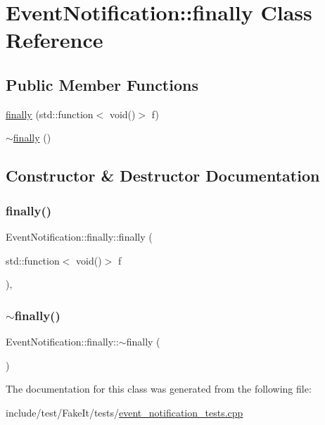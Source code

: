 \hypertarget{classEventNotification_1_1finally}{}\section{Event\+Notification\+::finally Class Reference}
\label{classEventNotification_1_1finally}
\subsection*{Public Member Functions}
\begin{DoxyCompactItemize}
\item 
\mbox{\hyperlink{classEventNotification_1_1finally_a7f542a45bebf9a7471332f858272643d}{finally}} (std\+::function$<$ void()$>$ f)
\item 
\mbox{\hyperlink{classEventNotification_1_1finally_a48671e7867f458a252a5269a95298495}{$\sim$finally}} ()
\end{DoxyCompactItemize}


\subsection{Constructor \& Destructor Documentation}
\mbox{\label{classEventNotification_1_1finally_a7f542a45bebf9a7471332f858272643d}} 
\subsubsection{\texorpdfstring{finally()}{finally()}}
{\footnotesize\ttfamily Event\+Notification\+::finally\+::finally (\begin{DoxyParamCaption}\item[{std\+::function$<$ void()$>$}]{f }\end{DoxyParamCaption})\hspace{0.3cm}{\ttfamily [inline]}, {\ttfamily [explicit]}}

\mbox{\label{classEventNotification_1_1finally_a48671e7867f458a252a5269a95298495}} 
\subsubsection{\texorpdfstring{$\sim$finally()}{~finally()}}
{\footnotesize\ttfamily Event\+Notification\+::finally\+::$\sim$finally (\begin{DoxyParamCaption}{ }\end{DoxyParamCaption})\hspace{0.3cm}{\ttfamily [inline]}}



The documentation for this class was generated from the following file\+:\begin{DoxyCompactItemize}
\item 
include/test/\+Fake\+It/tests/\mbox{\hyperlink{event__notification__tests_8cpp}{event\+\_\+notification\+\_\+tests.\+cpp}}\end{DoxyCompactItemize}
